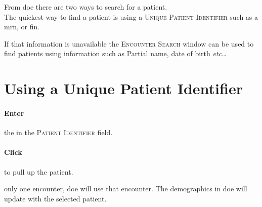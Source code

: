 From \acrlong{doe} there are two ways to search for a patient.\\
The quickest way to find a patient is using a \textsc{Unique Patient Identifier} such as a \gls{mrn}, or \gls{fin}.

If that information is unavailable the \textsc{Encounter Search} window can be used to find patients using information such as Partial name, date of birth \textit{etc\ldots}
\vfill
\section{Using a Unique Patient Identifier}\label{sec:doe_pid}
\vfill
\paragraph{Enter} the  in the \textsc{Patient Identifier} field.\\

\noindent
{}%
\paragraph{Click }  to pull up the patient.

\vfill
{} only one encounter, \gls{doe} will use that encounter. The demographics in \gls{doe} will update with the selected patient.

